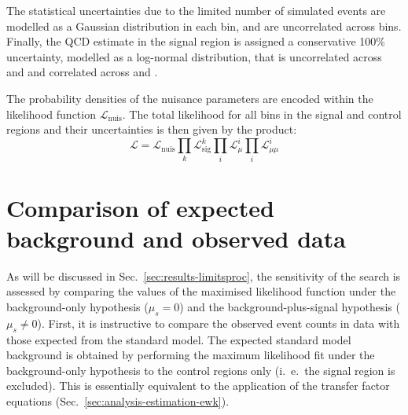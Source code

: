 The statistical uncertainties due to the limited number of simulated events are 
modelled as a Gaussian distribution in each bin, and are uncorrelated across 
bins. Finally, the QCD estimate in the signal region is assigned a conservative 
100\% uncertainty, modelled as a log-normal distribution, that is uncorrelated 
across \njet and \scalht and correlated across \nb and \mht.

The probability densities of the nuisance parameters %
are encoded within the likelihood function $\mathcal{L}_\mathrm{nuis}$.
The total likelihood for all bins in the signal and control regions and their 
uncertainties is then given by the product:
\begin{equation}
\mathcal{L} = \mathcal{L}_\mathrm{nuis} \prod_k \mathcal{L}_\mathrm{sig}^k 
\prod_i \mathcal{L}_{\mu}^i \prod_i \mathcal{L}_{\mu\mu}^i
\end{equation}




\section{Comparison of expected background and observed data}
\label{sec:results-results}
As will be discussed in Sec.~\ref{sec:results-limitsproc}, the sensitivity of 
the search is assessed by 
comparing the values of the maximised likelihood function under the 
background-only hypothesis ($\mu_s=0$) and the background-plus-signal 
hypothesis ($\mu_s \ne 0$). First, it is instructive to compare the observed 
event counts in 
data with those expected from the standard model. The expected standard model 
background is obtained by performing the maximum likelihood fit under the 
background-only hypothesis to the control regions only (i.~e.~the signal region 
is excluded). This is essentially equivalent to the application of the transfer 
factor equations (Sec.~\ref{sec:analysis-estimation-ewk}).

